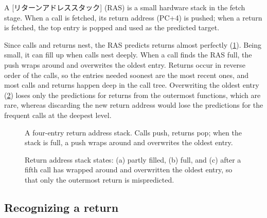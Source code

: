 \documentclass[../main.tex]{subfiles}
\begin{document}
\begin{definition}
  A [リターンアドレススタック]
  (RAS) is a small hardware stack in the fetch stage.  When a
  call is fetched, its return address (PC+4) is pushed; when a return is
  fetched, the top entry is popped and used as the predicted target.
\end{definition}

Since calls and returns nest, the RAS predicts returns almost perfectly
(\cref{fig:l04-ras}).  Being small, it can fill up when calls nest
deeply.
When a call finds the RAS full, the push wraps around and overwrites the
oldest entry.  Returns occur in reverse order of the calls, so the entries
needed soonest are the most recent ones, and most calls and returns happen
deep in the call tree.  Overwriting the oldest entry
(\cref{fig:l04-ras-states}) loses only the
predictions for returns from the outermost functions, which are rare, whereas
discarding the new return address would lose the predictions for the
frequent calls at the deepest level.

\begin{figure}[htbp]
  \centering
  
  \caption{A four-entry return address stack.  Calls push, returns pop; when
    the stack is full, a push wraps around and overwrites the oldest entry.}
  \label{fig:l04-ras}
\end{figure}

\begin{figure}[htbp]
  \centering
  
  \caption{Return address stack states: (a) partly filled, (b) full, and
    (c) after a fifth call has wrapped around and overwritten the oldest
    entry, so that only the outermost return is mispredicted.}
  \label{fig:l04-ras-states}
\end{figure}

\subsection{Recognizing a return}
\end{document}
